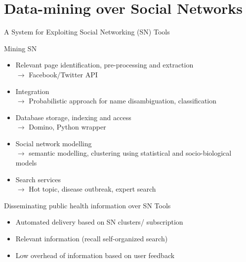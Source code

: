 \documentclass{beamer}
\begin{document}
\section{Data-mining over Social Networks}
\begin{frame}[t]{A System for Exploiting Social Networking (SN) Tools}	
\begin{block}{Mining SN}
\begin{itemize}
\item  \small Relevant page \alert{identification, pre-processing and extraction}\\
$\rightarrow$  \scriptsize Facebook/Twitter API
\item  \small \alert{Integration}\\ 
$\rightarrow$  \scriptsize  Probabilistic approach for name disambiguation, classification
\item  \small Database \alert{storage,  indexing and access}\\
$\rightarrow$  \scriptsize Domino, Python wrapper
\item \small Social network \alert{modelling}\\ 
$\rightarrow$  \scriptsize semantic modelling, clustering using statistical and socio-biological models
\item \small \alert{Search} services\\
$\rightarrow$ \scriptsize Hot topic, disease outbreak, expert search 
\end{itemize}
\end{block}
  	
\begin{block}{Disseminating public health information over SN Tools}
\begin{itemize}
\item \small \alert{Automated delivery} based on SN clusters/ subscription
\item \small \alert{Relevant} information (recall self-organized search)
\item \small \alert{Low overhead} of information based on user feedback
\end{itemize}
\end{block}
  	
\end{frame}

\end{document}

